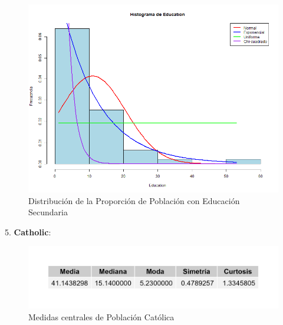 \documentclass{article}
\begin{document}
   \begin{figure}[h!]
    \centering
    \includegraphics[width=\textwidth]{Histogramas/histogram_education.png}
    \caption{Distribución de la Proporción de Población con Educación Secundaria}
    \end{figure}

5. \textbf{Catholic}:
\begin{figure}[h!]
 \centering
 \includegraphics[width=\textwidth]{Swiss/Catholic_central.png}
 \caption{Medidas centrales de Población Católica}
\end{figure}
\end{document}
